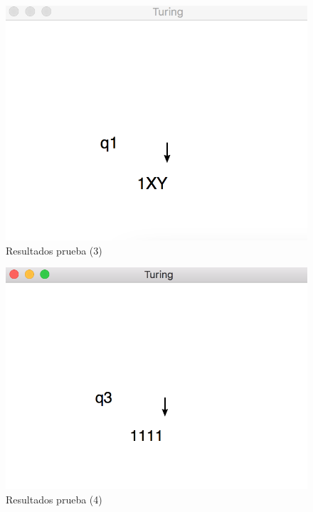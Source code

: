	\begin{figure}[H]
		\begin{center}
			\includegraphics[scale=.6]{img/prueba3.png}
			\caption{Resultados prueba (3)}
			\label{fig:maquin4}
		\end{center}
	\end{figure}
	\begin{figure}[H]
		\begin{center}
			\includegraphics[scale=.6]{img/prueba4.png}
			\caption{Resultados prueba (4)}
			\label{fig:maquina5}
		\end{center}
	\end{figure}